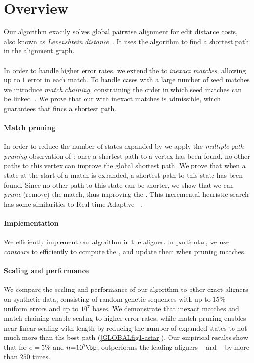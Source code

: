 

\section{Overview}

Our algorithm exactly solves global pairwise alignment for edit distance costs,
also known as \emph{Levenshtein distance}~\citep{levenshtein1966binary}. It uses
the \A algorithm to find a shortest path in the alignment graph.

\paragraph{\Sh} In order to handle higher error rates, we extend the \emph{\sh}
to \emph{inexact matches}, allowing up to $1$ error in each match.  To handle
cases with a large number of seed matches we introduce \emph{match chaining},
constraining the order in which seed matches can be
linked~\citep{wilbur1984context,benson2016lcsk}. We prove that our \emph{\csh}
with inexact matches is admissible, which guarantees that \A finds a shortest
path.

\paragraph{Match pruning}
In order to reduce the number of states expanded by \A we apply the
\emph{multiple-path pruning} observation of \citet{poole2017artificial}: once a
shortest path to a vertex has been found, no other paths to this vertex can
improve the global shortest path. We prove that when a state at the start of a
match is expanded, a shortest path to this state has been found. Since no other
path to this state can be shorter, we show that we can \emph{prune} (remove) the
match, thus improving the \sh. This incremental heuristic search has some
similarities to Real-time Adaptive \A~\citep{koenig2006real}.

\paragraph{Implementation}
We efficiently implement our algorithm in the \astarpa aligner. In particular,
we use \emph{contours}
\citep{hirschberg1977algorithms,hunt1977fast,pavetic2017fast} to efficiently to
compute the \csh, and update them when pruning matches.

\paragraph{Scaling and performance}
We compare the scaling and performance of our algorithm to other exact aligners
on synthetic data, consisting of random genetic sequences with up to $15\%$
uniform errors and up to $10^7$ bases. We demonstrate that inexact matches and
match chaining enable scaling to higher error rates, while match pruning enables
near-linear scaling with length by reducing the number of expanded states to not
much more than the best path (\cref{GLOBALfig1-astar}). Our empirical results
show that for $e{=}5\%$ and $n{=}10^7\bp$, \astarpa outperforms the leading
aligners \edlib~\citep{vsovsic2017edlib} and \wfa~\citep{marco2022optimal} by
more than $250$ times.

